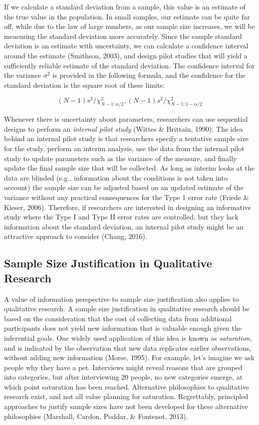 \documentclass[
  english,
  ,jou, a4paper,floatsintext]{apa6}
\begin{document}
If we calculate a standard deviation from a sample, this value is an estimate of the true value in the population. In small samples, our estimate can be quite far off, while due to the law of large numbers, as our sample size increases, we will be measuring the standard deviation more accurately. Since the sample standard deviation is an estimate with uncertainty, we can calculate a confidence interval around the estimate (Smithson, 2003), and design pilot studies that will yield a sufficiently reliable estimate of the standard deviation. The confidence interval for the variance \(\sigma^2\) is provided in the following formula, and the confidence for the standard deviation is the square root of these limits:

\[(N - 1)s^2/\chi^2_{N-1:\alpha/2},(N - 1)s^2/\chi^2_{N-1:1-\alpha/2}\]

Whenever there is uncertainty about parameters, researchers can use sequential designs to perform an \emph{internal pilot study} (Wittes \& Brittain, 1990). The idea behind an internal pilot study is that researchers specify a tentative sample size for the study, perform an interim analysis, use the data from the internal pilot study to update parameters such as the variance of the measure, and finally update the final sample size that will be collected. As long as interim looks at the data are blinded (e.g., information about the conditions is not taken into account) the sample size can be adjusted based on an updated estimate of the variance without any practical consequences for the Type 1 error rate (Friede \& Kieser, 2006). Therefore, if researchers are interested in designing an informative study where the Type I and Type II error rates are controlled, but they lack information about the standard deviation, an internal pilot study might be an attractive approach to consider (Chang, 2016).

\hypertarget{sample-size-justification-in-qualitative-research}{%
\subsection{Sample Size Justification in Qualitative Research}\label{sample-size-justification-in-qualitative-research}}

A value of information perspective to sample size justification also applies to qualitative research. A sample size justification in qualitative research should be based on the consideration that the cost of collecting data from additional participants does not yield new information that is valuable enough given the inferential goals. One widely used application of this idea is known as \emph{saturation}, and is indicated by the observation that new data replicates earlier observations, without adding new information (Morse, 1995). For example, let's imagine we ask people why they have a pet. Interviews might reveal reasons that are grouped into categories, but after interviewing 20 people, no new categories emerge, at which point saturation has been reached. Alternative philosophies to qualitative research exist, and not all value planning for saturation. Regrettably, principled approaches to justify sample sizes have not been developed for these alternative philosophies (Marshall, Cardon, Poddar, \& Fontenot, 2013).
\end{document}
